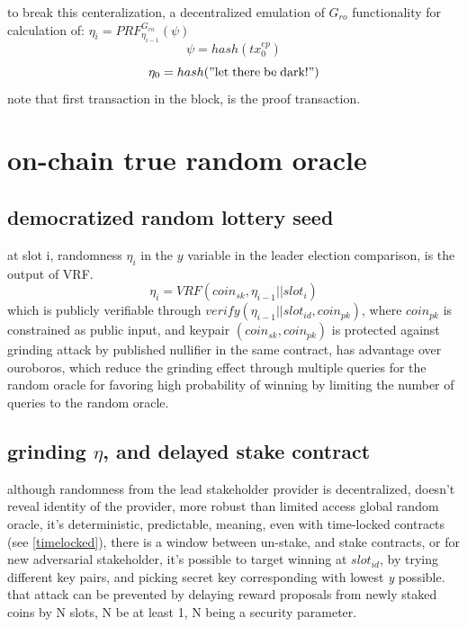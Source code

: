 \documentclass[a4paper]{article}
\begin{document}
to break this centeralization, a decentralized emulation of $G_{ro}$ functionality for calculation of: $\eta_i=PRF^{G_{ro}}_{\eta_{i-1}}(\psi)$
$$\psi   =  hash(tx^{ep}_{0})$$
$$\eta_0 =  hash(\mathrm{"let\; there\; be\; dark!"})$$
note that first transaction in the block, is the proof transaction.


\section {on-chain true random oracle}

\subsection{democratized random lottery seed}
at slot i, randomness $\eta_i$ in the $y$ variable in the leader election comparison, is the output of VRF.
$$\eta_i=VRF(coin_{sk}, \eta_{i-1}||slot_{i})$$  which is publicly verifiable through $verify(\eta_{i-1}||slot_{id}, coin_{pk})$, where $coin_{pk}$ is constrained as public input, and keypair $(coin_{sk},coin_{pk})$ is protected against grinding attack by published nullifier in the same contract, has advantage over ouroboros, which reduce the grinding effect through multiple queries for the random oracle for favoring high probability of winning by limiting the number of queries to the random oracle.  \cite{ouroboros_genesis}

\subsection {grinding $\eta$, and delayed stake contract}
although randomness from the lead stakeholder provider is decentralized, doesn't reveal identity of the provider, more robust than limited access global random oracle, it's deterministic, predictable, meaning, even with time-locked contracts (see \ref{timelocked}), there is a window between un-stake, and stake contracts, or for new adversarial stakeholder, it's possible to target winning at $slot_{id}$, by trying different key pairs, and picking secret key corresponding with lowest \emph{y} possible.
that attack can be prevented by delaying reward proposals from newly staked coins by N slots, N be at least 1, N being a security parameter.
\end{document}
